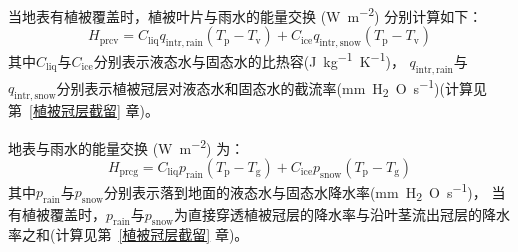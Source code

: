 当地表有植被覆盖时，植被叶片与雨水的能量交换 (\unit{W.m^{-2}}) 分别计算如下：
\begin{equation}
  H_{\mathrm{prcv}}=C_{\mathrm{liq}} q_{\mathrm{intr,rain}}\left(T_{\mathrm{p}}-T_{\mathrm{v}}\right)+C_{\mathrm{ice}} q_{\mathrm{intr,snow}}\left(T_{\mathrm{p}}-T_{\mathrm{v}}\right)
\end{equation}
其中$C_{\mathrm{liq}}$与$C_{\mathrm{ice}}$分别表示液态水与固态水的比热容(\unit{J.kg^{-1}.K^{-1}})，
$q_{\mathrm{intr,rain}}$与$q_{\mathrm{intr,snow}}$分别表示植被冠层对液态水和固态水的截流率(\unit{mm.H_2O.s^{-1}})(计算见第~\ref{植被冠层截留} 章)。


地表与雨水的能量交换 (\unit{W.m^{-2}}) 为：
\begin{equation}
  H_{\mathrm{p r c g}}=C_{\mathrm{liq}} p_{\mathrm {rain}}\left(T_{\mathrm{p}}-T_{\mathrm{g}}\right)+C_{\mathrm{ice}} p_{\mathrm {snow}}\left(T_{\mathrm{p}}-T_{\mathrm{g}}\right)
\end{equation}
其中$p_{\mathrm {rain}}$与$p_{\mathrm {snow}}$分别表示落到地面的液态水与固态水降水率(\unit{mm.H_2O.s^{-1}})，
当有植被覆盖时，$p_{\mathrm {rain}}$与$p_{\mathrm {snow}}$为直接穿透植被冠层的降水率与沿叶茎流出冠层的降水率之和(计算见第~\ref{植被冠层截留} 章)。
